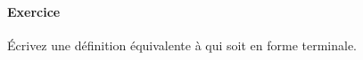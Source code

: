 \begin{itemize}
\end{itemize}

\paragraph{Exercice}

Écrivez une définition équivalente à  qui soit en forme
terminale.
